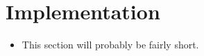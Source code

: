 \section{Implementation}
\label{sec:impl}

\begin{itemize}
    \item This section will probably be fairly short.
\end{itemize}